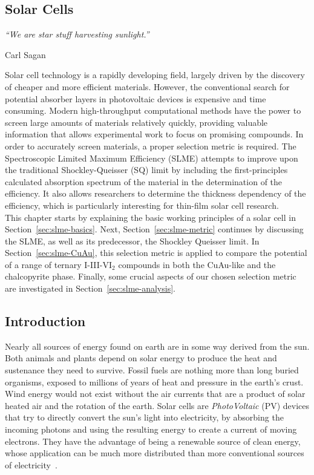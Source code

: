 \begin{refsection}

\chapter{Solar Cells}\label{chapter:solar}

\setlength{\epigraphwidth}{3in}
\epigraph{\textit{``We are star stuff harvesting sunlight.” }}{Carl Sagan}
\vspace{3em}

Solar cell technology is a rapidly developing field, largely driven by the discovery of cheaper and more efficient materials. However, the conventional search for potential absorber layers in photovoltaic devices is expensive and time consuming. Modern high-throughput computational methods have the power to screen large amounts of materials relatively quickly, providing valuable information that allows experimental work to focus on promising compounds. In order to accurately screen materials, a proper selection metric is required. The Spectroscopic Limited Maximum Efficiency (SLME) attempts to improve upon the traditional Shockley-Queisser (SQ) limit by including the first-principles calculated absorption spectrum of the material in the determination of the efficiency. It also allows researchers to determine the thickness dependency of the efficiency, which is particularly interesting for thin-film solar cell research. \\

This chapter starts by explaining the basic working principles of a solar cell in Section~\ref{sec:slme-basics}. Next, Section~\ref{sec:slme-metric} continues by discussing the SLME, as well as its predecessor, the Shockley Queisser limit. In Section~\ref{sec:slme-CuAu}, this selection metric is applied to compare the potential of a range of ternary I-III-VI$_2$ compounds in both the CuAu-like and the chalcopyrite phase. Finally, some crucial aspects of our chosen selection metric are investigated in Section~\ref{sec:slme-analysis}.

\pagebreak

\section{Introduction}

Nearly all sources of energy found on earth are in some way derived from the sun. Both animals and plants depend on solar energy to produce the heat and sustenance they need to survive. Fossil fuels are nothing more than long buried organisms, exposed to millions of years of heat and pressure in the earth's crust. Wind energy would not exist without the air currents that are a product of solar heated air and the rotation of the earth. Solar cells are \textit{PhotoVoltaic} (PV) devices that try to directly convert the sun's light into electricity, by absorbing the incoming photons and using the resulting energy to create a current of moving electrons. They have the advantage of being a renewable source of clean energy, whose application can be much more distributed than more conventional sources of electricity~\cite{Marsden2011}.


\end{refsection}
